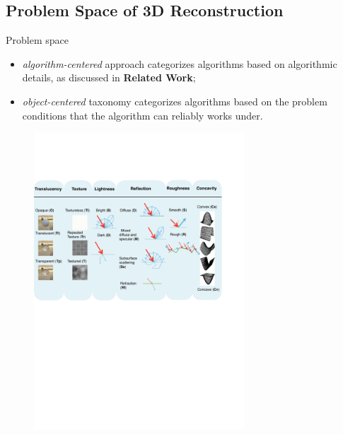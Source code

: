 \documentclass[10pt]{beamer}
\begin{document}
\subsection{Problem Space of 3D Reconstruction}
\begin{frame}{Problem space}

\begin{itemize}
\item \textit{algorithm-centered} approach categorizes algorithms based on algorithmic details, as discussed in \textbf{Related Work};
\item \textit{object-centered} taxonomy categorizes algorithms based on the problem conditions that the algorithm can reliably works under.
\end{itemize}

\begin{figure}
\includegraphics[width=0.7\textwidth]{prob_space/obj_class}
\end{figure}

\end{frame}
\end{document}
